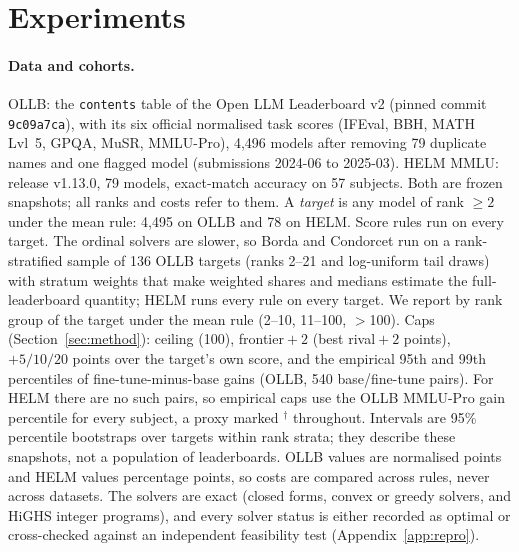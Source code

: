 \section{Experiments}
\label{sec:exp}

\paragraph{Data and cohorts.}
OLLB: the \texttt{contents} table of the Open LLM Leaderboard v2 (pinned commit \texttt{9c09a7ca}), with its six official normalised task scores (IFEval, BBH, MATH Lvl~5, GPQA, MuSR, MMLU-Pro), 4{,}496 models after removing 79 duplicate names and one flagged model (submissions 2024-06 to 2025-03).
HELM MMLU: release v1.13.0, 79 models, exact-match accuracy on 57 subjects.
Both are frozen snapshots; all ranks and costs refer to them.
A \emph{target} is any model of rank $\ge2$ under the mean rule: 4{,}495 on OLLB and 78 on HELM.
Score rules run on every target.
The ordinal solvers are slower, so Borda and Condorcet run on a rank-stratified sample of 136 OLLB targets (ranks 2--21 and log-uniform tail draws) with stratum weights that make weighted shares and medians estimate the full-leaderboard quantity; HELM runs every rule on every target.
We report by rank group of the target under the mean rule (2--10, 11--100, $>$100).
Caps (Section~\ref{sec:method}): ceiling (100), frontier${}+2$ (best rival${}+2$ points), $+5/10/20$ points over the target's own score, and the empirical 95th and 99th percentiles of fine-tune-minus-base gains (OLLB, 540 base/fine-tune pairs).
For HELM there are no such pairs, so empirical caps use the OLLB MMLU-Pro gain percentile for every subject, a proxy marked $^\dagger$ throughout.
Intervals are 95\% percentile bootstraps over targets within rank strata; they describe these snapshots, not a population of leaderboards.
OLLB values are normalised points and HELM values percentage points, so costs are compared across rules, never across datasets.
The solvers are exact (closed forms, convex or greedy solvers, and HiGHS integer programs), and every solver status is either recorded as optimal or cross-checked against an independent feasibility test (Appendix~\ref{app:repro}).

